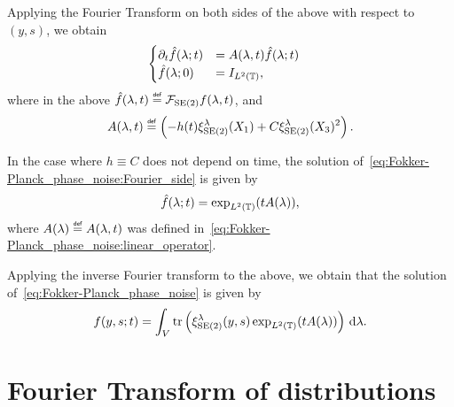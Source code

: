 Applying the Fourier Transform on both sides of the above with respect to $(y, s)$,
we obtain
\begin{align}
    \begin{cases}
        \D{1}{t} \hat f(\lambda; t) &= A(\lambda, t) \hat f(\lambda; t)\\
        \hat f(\lambda; 0) &= \Id{\Lebesgue 2 \T},
    \end{cases}
    \quad
    \label{eq:Fokker-Planck_phase_noise:Fourier_side}
\end{align}
where in the above $\hat f(\lambda, t) \defeq \Fourier [\MotionGroup 2] f(\lambda, t)$, and
\begin{align}
    A(\lambda, t) \defeq \left( -h(t) \Rep [\MotionGroup 2] \lambda (X_1) + C \Rep [\MotionGroup 2] \lambda ({X_3})^2 \right).
    \label{eq:Fokker-Planck_phase_noise:linear_operator}
\end{align}

\begin{example}[$h \equiv C$]
    In the case where $h \equiv C$ does not depend on time,
    the solution of~\eqref{eq:Fokker-Planck_phase_noise:Fourier_side} is given by
    \begin{align*}
        \hat f(\lambda; t) = \exp_{\Lebesgue 2 \T}(t A(\lambda)),
    \end{align*}
    where $A(\lambda) \defeq A(\lambda, t)$ was defined in~\eqref{eq:Fokker-Planck_phase_noise:linear_operator}.

    Applying the inverse Fourier transform to the above,
    we obtain that the solution of~\eqref{eq:Fokker-Planck_phase_noise} is given by
    \begin{align*}
        f(y, s; t) = \int_\VectorSpace \tr\left( \Rep [\MotionGroup 2] \lambda (y, s) \exp_{\Lebesgue 2 \T}(t A(\lambda)) \right) \dd \lambda.
    \end{align*}
\end{example}

\section{Fourier Transform of distributions}

